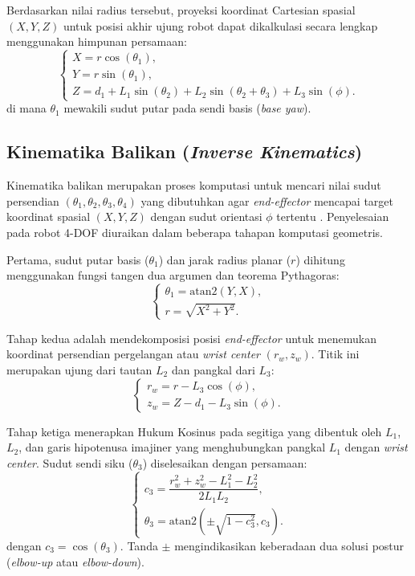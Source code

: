 Berdasarkan nilai radius tersebut, proyeksi koordinat Cartesian spasial $(X,Y,Z)$ untuk posisi akhir ujung robot dapat dikalkulasi secara lengkap menggunakan himpunan persamaan:
\begin{equation}
\begin{cases}
X = r \cos(\theta_1), \\
Y = r \sin(\theta_1), \\
Z = d_1 + L_1 \sin(\theta_2) + L_2 \sin(\theta_2 + \theta_3) + L_3 \sin(\phi).
\end{cases}
\label{eq:fk}
\end{equation}
di mana $\theta_1$ mewakili sudut putar pada sendi basis (\textit{base yaw}).

\subsection{Kinematika Balikan (\textit{Inverse Kinematics})}
Kinematika balikan merupakan proses komputasi untuk mencari nilai sudut persendian $(\theta_1, \theta_2, \theta_3, \theta_4)$ yang dibutuhkan agar \textit{end-effector} mencapai target koordinat spasial $(X,Y,Z)$ dengan sudut orientasi $\phi$ tertentu \cite{craig2018}. Penyelesaian pada robot 4-DOF diuraikan dalam beberapa tahapan komputasi geometris.

Pertama, sudut putar basis ($\theta_1$) dan jarak radius planar ($r$) dihitung menggunakan fungsi tangen dua argumen dan teorema Pythagoras:
\begin{equation}
\begin{cases}
\theta_1 = \text{atan2}(Y, X), \\
r = \sqrt{X^2 + Y^2}.
\end{cases}
\label{eq:ik_theta1}
\end{equation}

Tahap kedua adalah mendekomposisi posisi \textit{end-effector} untuk menemukan koordinat persendian pergelangan atau \textit{wrist center} $(r_w, z_w)$. Titik ini merupakan ujung dari tautan $L_2$ dan pangkal dari $L_3$:
\begin{equation}
\begin{cases}
r_w = r - L_3 \cos(\phi), \\
z_w = Z - d_1 - L_3 \sin(\phi).
\end{cases}
\label{eq:wrist_center}
\end{equation}

Tahap ketiga menerapkan Hukum Kosinus pada segitiga yang dibentuk oleh $L_1$, $L_2$, dan garis hipotenusa imajiner yang menghubungkan pangkal $L_1$ dengan \textit{wrist center}. Sudut sendi siku ($\theta_3$) diselesaikan dengan persamaan:
\begin{equation}
\begin{cases}
c_3 = \dfrac{r_w^2 + z_w^2 - L_1^2 - L_2^2}{2 L_1 L_2}, \\[10pt]
\theta_3 = \text{atan2}\left(\pm \sqrt{1 - c_3^2}, c_3\right).
\end{cases}
\label{eq:ik_theta3}
\end{equation}
dengan $c_3 = \cos(\theta_3)$. Tanda $\pm$ mengindikasikan keberadaan dua solusi postur (\textit{elbow-up} atau \textit{elbow-down}).

